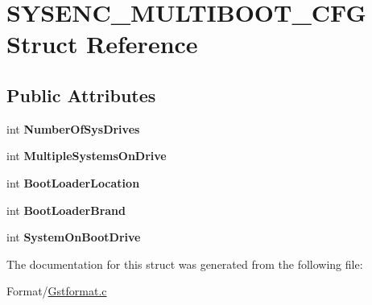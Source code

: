 \hypertarget{struct_s_y_s_e_n_c___m_u_l_t_i_b_o_o_t___c_f_g}{}\section{S\+Y\+S\+E\+N\+C\+\_\+\+M\+U\+L\+T\+I\+B\+O\+O\+T\+\_\+\+C\+FG Struct Reference}
\label{struct_s_y_s_e_n_c___m_u_l_t_i_b_o_o_t___c_f_g}
\subsection*{Public Attributes}
\begin{DoxyCompactItemize}
\item 
\mbox{\label{struct_s_y_s_e_n_c___m_u_l_t_i_b_o_o_t___c_f_g_a9dbdf95039725bfe2e89deb584891e35}} 
int {\bfseries Number\+Of\+Sys\+Drives}
\item 
\mbox{\label{struct_s_y_s_e_n_c___m_u_l_t_i_b_o_o_t___c_f_g_af1fd6c3282ef5df8250b03b4258b6d20}} 
int {\bfseries Multiple\+Systems\+On\+Drive}
\item 
\mbox{\label{struct_s_y_s_e_n_c___m_u_l_t_i_b_o_o_t___c_f_g_ad9009a3e0ab13f6eb484021575f0fc2b}} 
int {\bfseries Boot\+Loader\+Location}
\item 
\mbox{\label{struct_s_y_s_e_n_c___m_u_l_t_i_b_o_o_t___c_f_g_ad493ab7e84d3b8d173584f8e34a790da}} 
int {\bfseries Boot\+Loader\+Brand}
\item 
\mbox{\label{struct_s_y_s_e_n_c___m_u_l_t_i_b_o_o_t___c_f_g_ad47e04e12968d2c3a0c61c3ef57b8f49}} 
int {\bfseries System\+On\+Boot\+Drive}
\end{DoxyCompactItemize}


The documentation for this struct was generated from the following file\+:\begin{DoxyCompactItemize}
\item 
Format/\hyperlink{_gstformat_8c}{Gstformat.\+c}\end{DoxyCompactItemize}
